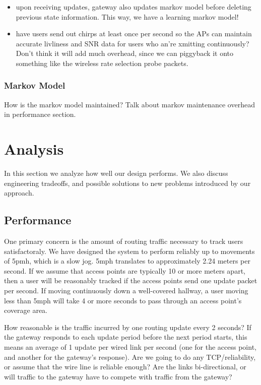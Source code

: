 \documentclass[letterpaper,12pt]{article}
\begin{document}
\begin{itemize}
\item upon receiving updates, gateway also updates markov model before deleting
previous state information. This way, we have a learning markov model!

\item have users send out chirps at least once per second so the APs can 
maintain accurate livliness and SNR data for users who an're xmitting 
continuously? Don't think it will add much overhead, since we can piggyback 
it onto something like the wireless rate selection probe packets.

\end{itemize}

\subsubsection{Markov Model}
How is the markov model maintained? Talk about markov maintenance overhead
in performance section.

\section{Analysis}

In this section we analyze how well our design performs. We also discuss 
engineering tradeoffs, and possible solutions to new problems introduced by 
our approach.

\subsection{Performance}
One primary concern is the amount of routing traffic necessary to track
users satisfactoraly. We have designed the system to perform reliably
up to movements of 5pmh, which is a slow jog. 5mph translates to approximately
2.24 meters per second. If we assume that access points are typically 10 or more
meters apart, then a user will be reasonably tracked if the access points
send one update packet per second. If moving continuously down a well-covered
hallway, a user moving less than 5mph will take 4 or more seconds to pass
through an access point's coverage area. 

How reasonable is the traffic incurred by one routing update every 2 seconds? 
If the gateway responds to each update period before the next period starts,
this means an average of 1 update per wired link per second (one for the 
access point, and another for the gateway's response). Are we going to do
any TCP/reliability, or assume that the wire line is reliable enough?
Are the links bi-directional, or will traffic to the gateway have to
compete with traffic from the gateway?
\end{document}
